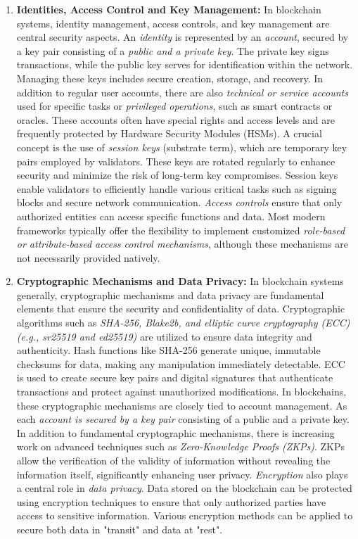 \begin{enumerate}[label=(\arabic*)]
	\item\textbf{Identities, Access Control and Key Management:}
	In blockchain systems, identity management, access controls, and key management are central security aspects. An \textit{identity} is represented by an \textit{account}, secured by a key pair consisting of a \textit{public and a private key}. The private key signs transactions, while the public key serves for identification within the network. Managing these keys includes secure creation, storage, and recovery.
	In addition to regular user accounts, there are also \textit{technical or service accounts} used for specific tasks or \textit{privileged operations}, such as smart contracts or oracles. These accounts often have special rights and access levels and are frequently protected by Hardware Security Modules (HSMs).
	A crucial concept is the use of \textit{session keys} (substrate term), which are temporary key pairs employed by validators. These keys are rotated regularly to enhance security and minimize the risk of long-term key compromises. Session keys enable validators to efficiently handle various critical tasks such as signing blocks and secure network communication. 
	\textit{Access controls} ensure that only authorized entities can access specific functions and data. Most modern frameworks typically offer the flexibility to implement customized \textit{role-based or attribute-based access control mechanisms}, although these mechanisms are not necessarily provided natively.

	\item\textbf{Cryptographic Mechanisms and Data Privacy:} 
	In blockchain systems generally, cryptographic mechanisms and data privacy are fundamental elements that ensure the security and confidentiality of data. Cryptographic algorithms such as \textit{SHA-256, Blake2b, and elliptic curve cryptography (ECC) (e.g., sr25519 and ed25519)} are utilized to ensure data integrity and authenticity. Hash functions like SHA-256 generate unique, immutable checksums for data, making any manipulation immediately detectable. ECC is used to create secure key pairs and digital signatures that authenticate transactions and protect against unauthorized modifications.
	In blockchains, these cryptographic mechanisms are closely tied to account management. As each \textit{account is secured by a key pair} consisting of a public and a private key. In addition to fundamental cryptographic mechanisms, there is increasing work on advanced techniques such as \textit{Zero-Knowledge Proofs (ZKPs)}. ZKPs allow the verification of the validity of information without revealing the information itself, significantly enhancing user privacy.
	\textit{Encryption} also plays a central role in \textit{data privacy}. Data stored on the blockchain can be protected using encryption techniques to ensure that only authorized parties have access to sensitive information. Various encryption methods can be applied to secure both data in "transit" and data at "rest".


\end{enumerate}
